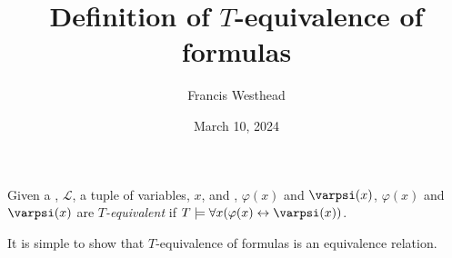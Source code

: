\documentclass[a4paper]{article}
\title{Definition of \(T\)-equivalence of formulas}
\date{March 10, 2024}
\author{Francis Westhead}
\begin{document}
\maketitle
\par{Given a , \(\mathcal {L}\), a tuple of variables, \(x\), and , \(\varphi (x)\) and \(\varpsi (x)\), \(\varphi (x)\) and \(\varpsi (x)\) are \emph{\(T\)-equivalent} if \(T  \models   \forall  x ( \varphi (x)  \leftrightarrow   \varpsi (x))\). }\par{It is simple to show that \(T\)-equivalence of formulas is an equivalence relation.}
\printbibliography
\end{document}
